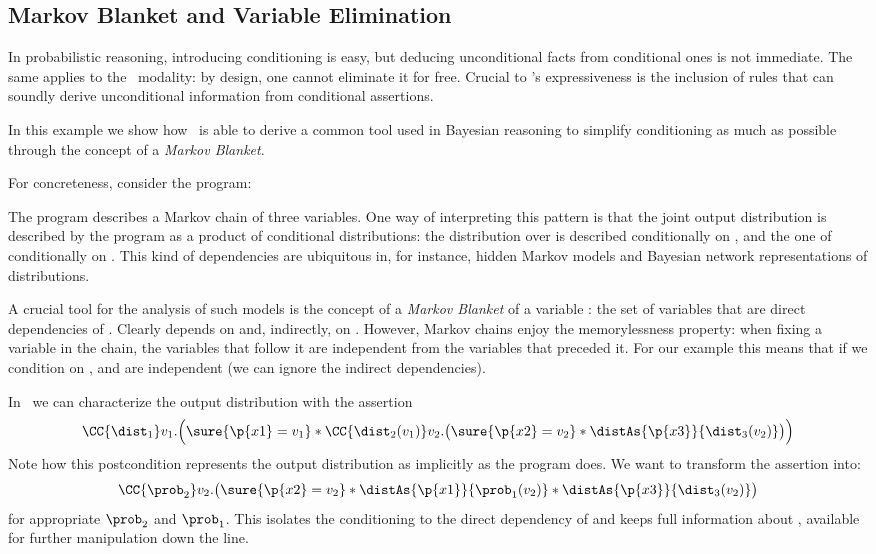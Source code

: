 \subsection{Markov Blanket and Variable Elimination}
\label{sec:appendix:ex:markov-blanket}

  In probabilistic reasoning, introducing conditioning is easy,
but deducing unconditional facts from conditional ones is not immediate.
The same applies to the \supercond\ modality: by design, one cannot eliminate it for free.
Crucial to \thelogic's expressiveness is the inclusion of rules that can
soundly derive unconditional information from conditional assertions.

In this example we show how \thelogic\ is able to derive a common
tool used in Bayesian reasoning to simplify conditioning as much as possible
through the concept of a \emph{Markov Blanket}.

For concreteness, consider the program:
\begin{center}
\end{center}
The program describes a Markov chain of three variables.
One way of interpreting this pattern is that the joint output distribution
is described by the program as a product of conditional distributions:
the distribution over  is described conditionally on ,
and the one of  conditionally on .
This kind of dependencies are ubiquitous in, for instance, hidden Markov models and Bayesian network representations of distributions.

A crucial tool for the analysis of such models is the concept of a
\emph{Markov Blanket} of a variable : the set of variables that are direct dependencies of .
Clearly  depends on  and, indirectly, on .
However, Markov chains enjoy the memorylessness property:
when fixing a variable in the chain, the variables that follow it are independent from the variables that preceded it.
For our example this means that if we condition on ,
 and  are independent (\ie we can ignore the indirect dependencies).

In \thelogic\ we can characterize the output distribution with the assertion
\[
  \CC{\dist_1} v_1. \Bigl(
    \sure{\p{x1}=v_1} *
    \CC{\dist_2(v_1)} v_2. \bigl(
      \sure{\p{x2}=v_2} *
      \distAs{\p{x3}}{\dist_3(v_2)}
    \bigr)
  \Bigr)
\]
Note how this postcondition represents the output distribution
as implicitly as the program does.
We want to transform the assertion into:
\[
  \CC{\prob_2} v_2.
  \bigl(
    \sure{\p{x2}=v_2} *
    \distAs{\p{x1}}{\prob_1(v_2)} *
    \distAs{\p{x3}}{\dist_3(v_2)}
  \bigr)
\]
for appropriate $\prob_2$ and $\prob_1$.
This isolates the conditioning to the direct dependency of 
and keeps full information about ,
available for further manipulation down the line.

